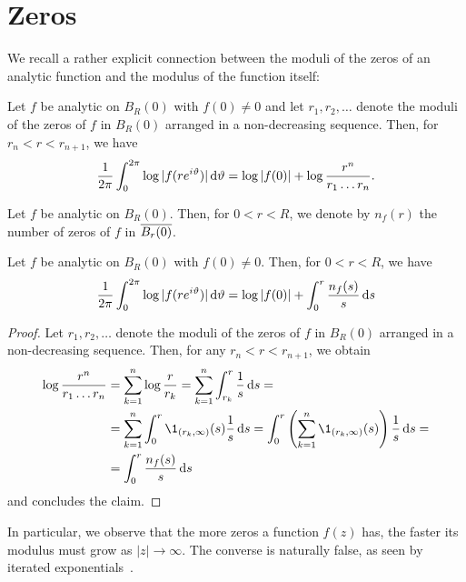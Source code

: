 \section{Zeros}
\label{sec:zeros}

We recall a rather explicit connection between the moduli of the zeros of an analytic function and the modulus of the function itself:

\begin{theorem} \label{thm:jensen}
    Let $f$ be analytic on $B_{R}(0)$ with $f(0) \neq 0$ and let $r_1, r_2, \hdots$ denote the moduli of the zeros of $f$ in $B_{R}(0)$ arranged in a non-decreasing sequence. Then, for $r_n < r < r_{n+1}$, we have
    $$ \frac{1}{2 \pi} \int_0^{2\pi} \log \vert f(r e^{i \vartheta}) \vert \mathop{}\!\mathrm{d} \vartheta = \log \vert f(0) \vert + \log \frac{r^n}{r_1 \hdots r_n}. $$
\end{theorem}

\begin{definition}
    Let $f$ be analytic on $B_{R}(0)$. Then, for $0 < r < R$, we denote by $n_f(r)$ the number of zeros of $f$ in $\overline{B_{r}(0)}$.
\end{definition}

\begin{corollary}
    Let $f$ be analytic on $B_{R}(0)$ with $f(0) \neq 0$. Then, for $0 < r < R$, we have
    $$ \frac{1}{2 \pi} \int_0^{2\pi} \log \vert f(re^{i \vartheta}) \vert \mathop{}\!\mathrm{d} \vartheta = \log \vert f(0) \vert + \int_0^r \frac{n_f(s)}{s} \mathop{}\!\mathrm{d} s $$
\end{corollary}

\begin{proof}
    Let $r_1, r_2, \hdots$ denote the moduli of the zeros of $f$ in $B_{R}(0)$ arranged in a non-decreasing sequence. Then, for any $r_n < r < r_{n+1}$, we obtain
    \begin{align*}
        \log \frac{r^n}{r_1 \hdots r_n} &= \sum_{k=1}^n \log \frac{r}{r_k} = \sum_{k=1}^n \int_{r_k}^r \frac{1}{s} \diff s = \\
        &= \sum_{k=1}^n \int_0^r \1_{(r_k, \infty)}(s) \frac{1}{s} \diff s = \int_0^r \left( \sum_{k=1}^n \1_{(r_k, \infty)}(s) \right) \frac{1}{s} \diff s = \\
        &= \int_0^r \frac{n_f(s)}{s} \diff s
    \end{align*}
    and  concludes the claim.
\end{proof}

In particular, we observe that the more zeros a function $f(z)$ has, the faster its modulus must grow as $\vert z \vert \to \infty$. The converse is naturally false, as seen by iterated exponentials~\cite{segal-complex-analysis}.

